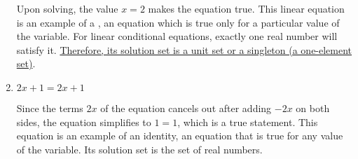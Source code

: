 \begin{example}
\begin{enumerate}[1.]
	Upon solving, the value $x = 2$ makes the equation true. This linear equation is an example of a , an equation which is true only for a particular value of the variable. For linear conditional equations, exactly one real number will satisfy it. \underline{Therefore, its solution set is a unit set or a singleton (a one-element set)}.
	
	\item $2x + 1 = 2x + 1$
	
	Since the terms $2x$ of the equation cancels out after adding $-2x$ on both sides, the equation simplifies to $1 = 1$, which is a true statement. This equation is an example of an identity, an equation that is true for any value of the variable. Its solution set is the set of real numbers.
	\end{enumerate}
\end{example}
